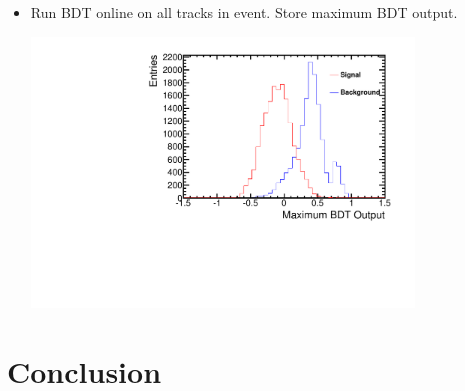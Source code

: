 \documentclass{beamer}
\begin{document}
{{\begin{itemize}
\item Run BDT online on all tracks in event. Store maximum BDT output.
  \begin{center}
    \includegraphics[width=0.8\textwidth]{Isolation_BDT.pdf}  
\end{center}

\end{itemize}

}

\section{Conclusion}



}
 
\end{document}
